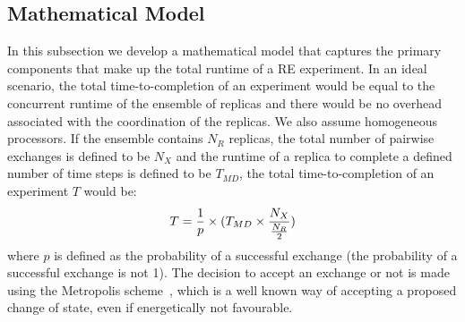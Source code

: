 \documentclass{rspublic}
\begin{document}
\subsection{Mathematical Model}
\label{sec:math-model}
In this subsection we develop a mathematical model that captures
the primary components that make up the total runtime of a RE
experiment. In an ideal scenario, the total time-to-completion of an
experiment would be equal to the concurrent runtime of the ensemble of
replicas and there would be no overhead associated with the
coordination of the replicas. We also assume homogeneous processors. If the ensemble contains $N_R$
replicas, the total number of pairwise exchanges is defined to be $N_X$ and the
runtime of a replica to complete a defined number of time steps is defined to be
$T_{MD}$, the total time-to-completion of an experiment $T$ would
be:
\begin{eqnarray}
T = {1\over p} \times (T_{MD} \times  {N_X \over {N_R \over 2}}) 
\label{eq:totaltime1}
\end{eqnarray}
where $p$ is defined as the probability of a successful exchange (the
probability of a successful exchange is not 1). The decision to accept
an exchange or not is made using the Metropolis
scheme~\citep{metropolis:1087}, which is a well known way of accepting
a proposed change of state, even if energetically not favourable.

\end{document}
